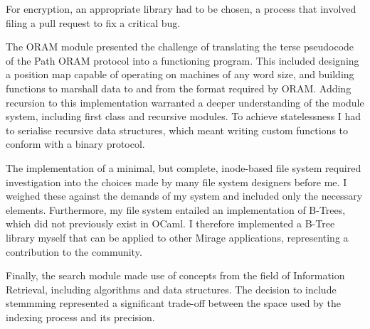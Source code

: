 \documentclass[12pt,a4paper,twoside,openright]{report}
\begin{document}
For encryption, an appropriate library had to be chosen, a process that involved filing a pull request to fix a critical bug.

The ORAM module presented the challenge of translating the terse pseudocode of the Path ORAM protocol into a functioning program. This included designing a position map capable of operating on machines of any word size, and building functions to marshall data to and from the format required by ORAM. Adding recursion to this implementation warranted a deeper understanding of the module system, including first class and recursive modules. To achieve statelessness I had to serialise recursive data structures, which meant writing custom functions to conform with a binary protocol.

The implementation of a minimal, but complete, inode-based file system required investigation into the choices made by many file system designers before me. I weighed these against the demands of my system and included only the necessary elements. Furthermore, my file system entailed an implementation of B-Trees, which did not previously exist in OCaml. I therefore implemented a B-Tree library myself that can be applied to other Mirage applications, representing a contribution to the community.

Finally, the search module made use of concepts from the field of Information Retrieval, including algorithms and data structures. The decision to include stemmming represented a significant trade-off between the space used by the indexing process and its precision.
\end{document}
